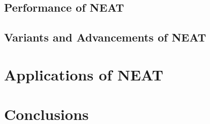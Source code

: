\documentclass[journal, a4paper]{IEEEtran}
\begin{document}
\subsection{Performance of NEAT}

\subsection{Variants and Advancements of NEAT}




\section{Applications of NEAT}




\section{Conclusions}

\blindtext



\end{document}
